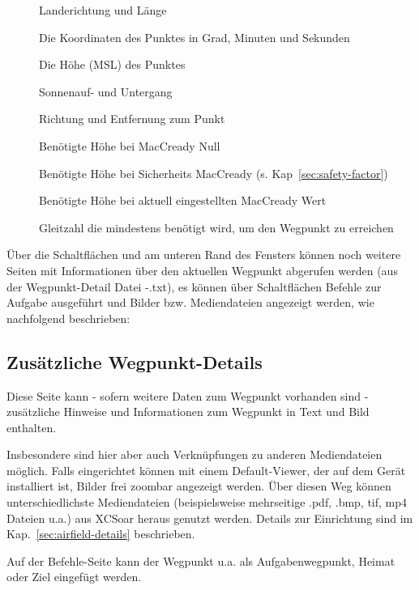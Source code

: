 \begin{description}
\item[] Landerichtung und Länge 
\item[] Die Koordinaten des Punktes in Grad, Minuten und Sekunden
\item[] Die Höhe (MSL) des Punktes
\item[] Sonnenauf- und Untergang
\item[] Richtung und Entfernung zum Punkt
\item[] Benötigte Höhe bei MacCready Null
\item[] Benötigte Höhe bei Sicherheits MacCready (s. Kap~\ref{sec:safety-factor})
\item[] Benötigte Höhe bei aktuell eingestellten MacCready Wert
\item[] Gleitzahl die mindestens benötigt wird, um den Wegpunkt zu erreichen
\end{description}

Über die Schaltflächen \button{$<$} und \button{$>$} am unteren Rand des Fensters können noch weitere Seiten mit Informationen über den aktuellen Wegpunkt abgerufen werden (aus der Wegpunkt-Detail Datei -.txt), es können über Schaltflächen Befehle zur Aufgabe ausgeführt und Bilder bzw. Mediendateien angezeigt werden, wie nachfolgend beschrieben:

\subsection*{Zusätzliche Wegpunkt-Details}
Diese Seite kann - sofern weitere Daten zum Wegpunkt vorhanden sind - zusätzliche Hinweise und Informationen 
zum Wegpunkt in Text und Bild enthalten. 

Insbesondere sind hier aber auch Verknüpfungen zu anderen Mediendateien möglich. Falls eingerichtet können mit einem Default-Viewer, der auf dem Gerät installiert ist, Bilder frei zoombar angezeigt werden. Über diesen Weg können unterschiedlichste Mediendateien (beispielsweise mehrseitige .pdf, .bmp, tif, mp4 Dateien u.a.) aus XCSoar heraus genutzt werden. Details zur Einrichtung sind im Kap.~\ref{sec:airfield-details} beschrieben.


Auf der Befehle-Seite kann der Wegpunkt u.a. als Aufgabenwegpunkt, Heimat oder Ziel eingefügt werden.

